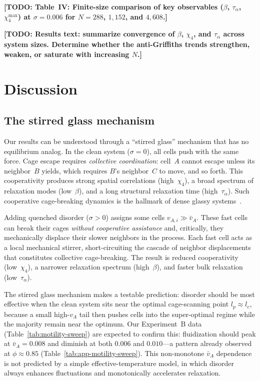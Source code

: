 \documentclass[aps,pre,twocolumn,superscriptaddress,longbibliography,floatfix]{revtex4-2}
\newcommand{\TODO}[1]{{\color{red}\textbf{[TODO: #1]}}}
\begin{document}
\TODO{Table~IV: Finite-size comparison of key observables ($\beta$,
$\tau_\alpha$, $\chi_4^{\max}$) at $\sigma\!=\!0.006$ for
$N\!=\!288$, $1{,}152$, and $4{,}608$.}

\TODO{Results text: summarize convergence of $\beta$, $\chi_4$, and
$\tau_\alpha$ across system sizes.  Determine whether the anti-Griffiths
trends strengthen, weaken, or saturate with increasing $N$.}

\section{Discussion}
\label{sec:discussion}

\subsection{The stirred glass mechanism}

Our results can be understood through a ``stirred glass'' mechanism
that has no equilibrium analog.  In the clean system ($\sigma\!=\!0$),
all cells push with the same force.  Cage escape requires
\emph{collective coordination}: cell~$A$ cannot escape unless its
neighbor~$B$ yields, which requires $B$'s neighbor~$C$ to move, and so
forth.  This cooperativity produces strong spatial correlations
(high~$\chi_4$), a broad spectrum of relaxation modes (low~$\beta$),
and a long structural relaxation time (high~$\tau_\alpha$).  Such
cooperative cage-breaking dynamics is the hallmark of dense glassy
systems~\cite{berthier2011,berthier2019}.

Adding quenched disorder ($\sigma > 0$) assigns some cells
$v_{A,i}\gg\bar{v}_A$.  These fast cells can break their cages
\emph{without cooperative assistance} and, critically, they
mechanically displace their slower neighbors in the process.  Each fast
cell acts as a local mechanical stirrer, short-circuiting the cascade
of neighbor displacements that constitutes collective cage-breaking.
The result is reduced cooperativity (low~$\chi_4$), a narrower
relaxation spectrum (high~$\beta$), and faster bulk relaxation
(low~$\tau_\alpha$).

The stirred glass mechanism makes a testable prediction: disorder
should be most effective when the clean system sits near the optimal
cage-scanning point $l_p\!\approx\!l_c$, because a small high-$v_A$
tail then pushes cells into the super-optimal regime while the majority
remain near the optimum.  Our Experiment~B data
(Table~\ref{tab:motility-sweep}) are expected to confirm this: fluidization should peak at
$\bar{v}_A\!=\!0.008$ and diminish at both $0.006$ and $0.010$---a
pattern already observed at $\phi\!\approx\!0.85$
(Table~\ref{tab:app-motility-sweep}).
This non-monotone $\bar{v}_A$ dependence is not predicted by a simple
effective-temperature model, in which disorder always enhances
fluctuations and monotonically accelerates relaxation.
\end{document}
